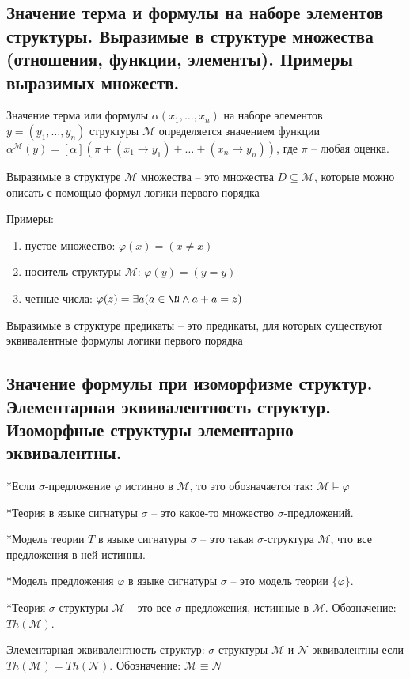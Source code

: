 \documentclass[a4paper, 10pt]{article}
\newcommand{\MM}{\mathcal{M}}
\newcommand{\NN}{\mathcal{N}}
\begin{document}
\subsection{Значение терма и формулы на наборе элементов структуры. Выразимые в структуре множества (отношения, функции, элементы). Примеры выразимых множеств.}

Значение терма или формулы $\alpha(x_1,\ldots,x_n)$ на наборе элементов $y=(y_1,\ldots,y_n)$ структуры $\MM$ определяется значением функции $\alpha^\MM(y)=[\alpha](\pi + (x_1\to y_1) + \ldots + (x_n\to y_n))$, где $\pi$ -- любая оценка.

\hfill

Выразимые в структуре $\MM$ множества -- это множества $D\subseteq\MM$, которые можно описать с помощью формул логики первого порядка

Примеры:
\begin{enumerate}
    \item пустое множество: $\varphi(x)=(x\not=x)$
    \item носитель структуры $\MM$: $\varphi(y)=(y=y)$
    \item четные числа: $\varphi(z)=\exists a (a\in\N \land a+a=z)$
\end{enumerate}

Выразимые в структуре предикаты -- это предикаты, для которых существуют эквивалентные формулы логики первого порядка

\subsection{Значение формулы при изоморфизме структур. Элементарная эквивалентность структур. Изоморфные структуры элементарно эквивалентны.}

*Если $\sigma$-предложение $\varphi$ истинно в $\MM$, то это обозначается так: $\MM\models\varphi$

*Теория в языке сигнатуры $\sigma$ -- это какое-то множество $\sigma$-предложений.

*Модель теории $T$ в языке сигнатуры $\sigma$ -- это такая $\sigma$-структура $\MM$, что все предложения в ней истинны.

*Модель предложения $\varphi$ в языке сигнатуры $\sigma$ -- это модель теории $\{\varphi\}$.

*Теория $\sigma$-структуры $\MM$ -- это все $\sigma$-предложения, истинные в $\MM$. Обозначение: $Th(\MM)$.

\hfill

Элементарная эквивалентность структур: $\sigma$-структуры $\MM$ и $\NN$ эквивалентны если $Th(\MM)=Th(\NN)$. Обозначение: $\MM\equiv\NN$
\end{document}
